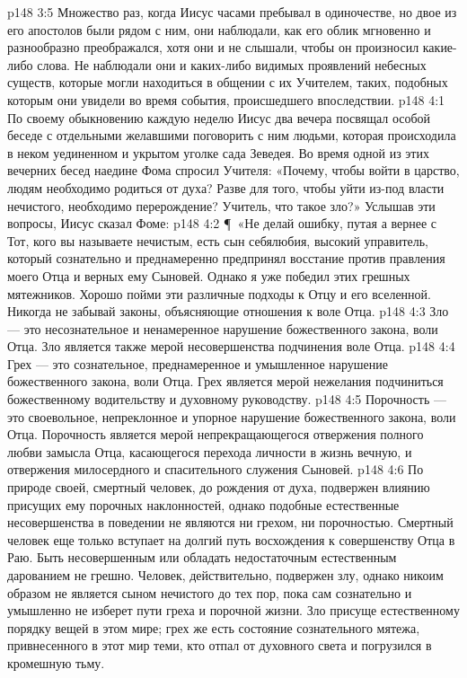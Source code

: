\vs p148 3:5 Множество раз, когда Иисус часами пребывал в одиночестве, но двое из его апостолов были рядом с ним, они наблюдали, как его облик мгновенно и разнообразно преображался, хотя они и не слышали, чтобы он произносил какие\hyp{}либо слова. Не наблюдали они и каких\hyp{}либо видимых проявлений небесных существ, которые могли находиться в общении с их Учителем, таких, подобных которым они увидели во время события, происшедшего впоследствии.
\vs p148 4:1 По своему обыкновению каждую неделю Иисус два вечера посвящал особой беседе с отдельными желавшими поговорить с ним людьми, которая происходила в неком уединенном и укрытом уголке сада Зеведея. Во время одной из этих вечерних бесед наедине Фома спросил Учителя: «Почему, чтобы войти в царство, людям необходимо родиться от духа? Разве для того, чтобы уйти из\hyp{}под власти нечистого, необходимо перерождение? Учитель, что такое зло?» Услышав эти вопросы, Иисус сказал Фоме:
\vs p148 4:2 \P\ «Не делай ошибку, путая  а вернее с  Тот, кого вы называете нечистым, есть сын себялюбия, высокий управитель, который сознательно и преднамеренно предпринял восстание против правления моего Отца и верных ему Сыновей. Однако я уже победил этих грешных мятежников. Хорошо пойми эти различные подходы к Отцу и его вселенной. Никогда не забывай законы, объясняющие отношения к воле Отца.
\vs p148 4:3 Зло --- это несознательное и ненамеренное нарушение божественного закона, воли Отца. Зло является также мерой несовершенства подчинения воле Отца.
\vs p148 4:4 Грех --- это сознательное, преднамеренное и умышленное нарушение божественного закона, воли Отца. Грех является мерой нежелания подчиниться божественному водительству и духовному руководству.
\vs p148 4:5 Порочность --- это своевольное, непреклонное и упорное нарушение божественного закона, воли Отца. Порочность является мерой непрекращающегося отвержения полного любви замысла Отца, касающегося перехода личности в жизнь вечную, и отвержения милосердного и спасительного служения Сыновей.
\vs p148 4:6 По природе своей, смертный человек, до рождения от духа, подвержен влиянию присущих ему порочных наклонностей, однако подобные естественные несовершенства в поведении не являются ни грехом, ни порочностью. Смертный человек еще только вступает на долгий путь восхождения к совершенству Отца в Раю. Быть несовершенным или обладать недостаточным естественным дарованием не грешно. Человек, действительно, подвержен злу, однако никоим образом не является сыном нечистого до тех пор, пока сам сознательно и умышленно не изберет пути греха и порочной жизни. Зло присуще естественному порядку вещей в этом мире; грех же есть состояние сознательного мятежа, привнесенного в этот мир теми, кто отпал от духовного света и погрузился в кромешную тьму.
